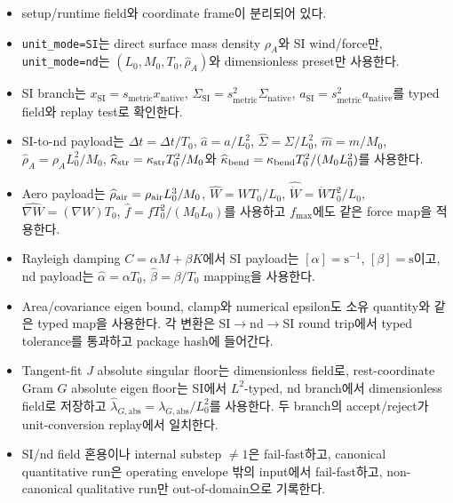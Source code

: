 \documentclass[10pt]{article}
\newcommand{\code}[1]{{\small\nolinkurl{#1}}}
\begin{document}
\begin{itemize}
  \item [\(\square\)] setup/runtime field와 coordinate frame이 분리되어 있다.
  \item [\(\square\)] \code{unit\_mode=SI}는 direct surface mass density \(\rho_A\)와 SI wind/force만,
  \code{unit\_mode=nd}는 \((L_0,M_0,T_0,\widehat\rho_A)\)와 dimensionless preset만 사용한다.
  \item [\(\square\)] SI branch는
  \(x_{\mathrm{SI}}=s_{\mathrm{metric}}x_{\mathrm{native}}\),
  \(\Sigma_{\mathrm{SI}}=s_{\mathrm{metric}}^2\Sigma_{\mathrm{native}}\),
  \(a_{\mathrm{SI}}=s_{\mathrm{metric}}^2a_{\mathrm{native}}\)를 typed field와 replay test로 확인한다.
  \item [\(\square\)] SI-to-nd payload는
  \(\widehat{\Delta t}=\Delta t/T_0\),
  \(\widehat a=a/L_0^2\), \(\widehat\Sigma=\Sigma/L_0^2\),
  \(\widehat m=m/M_0\), \(\widehat\rho_A=\rho_A L_0^2/M_0\),
  \(\widehat\kappa_{\rm str}=\kappa_{\rm str}T_0^2/M_0\)와
  \(\widehat\kappa_{\rm bend}=\kappa_{\rm bend}T_0^2/(M_0L_0^2)\)를 사용한다.
  \item [\(\square\)] Aero payload는
  \(\widehat\rho_{\rm air}=\rho_{\rm air}L_0^3/M_0\),
  \(\widehat W=WT_0/L_0\),
  \(\widehat{\dot W}=\dot W T_0^2/L_0\),
  \(\widehat{\nabla W}=(\nabla W)T_0\),
  \(\widehat f=fT_0^2/(M_0L_0)\)를 사용하고 \(f_{\max}\)에도 같은 force map을 적용한다.
  \item [\(\square\)] Rayleigh damping \(C=\alpha M+\beta K\)에서 SI payload는
  \([\alpha]=\mathrm{s}^{-1}\), \([\beta]=\mathrm{s}\)이고, nd payload는
  \(\widehat\alpha=\alpha T_0\), \(\widehat\beta=\beta/T_0\) mapping을 사용한다.
  \item [\(\square\)] Area/covariance eigen bound, clamp와 numerical epsilon도 소유 quantity와
  같은 typed map을 사용한다. 각 변환은 SI\(\rightarrow\)nd\(\rightarrow\)SI round trip에서
  typed tolerance를 통과하고 package hash에 들어간다.
  \item [\(\square\)] Tangent-fit \(J\) absolute singular floor는 dimensionless field로,
  rest-coordinate Gram \(G\) absolute eigen floor는 SI에서 \(L^2\)-typed,
  nd branch에서 dimensionless field로 저장하고
  \(\widehat\lambda_{G,\mathrm{abs}}=\lambda_{G,\mathrm{abs}}/L_0^2\)를 사용한다.
  두 branch의 accept/reject가 unit-conversion replay에서 일치한다.
  \item [\(\square\)] SI/nd field 혼용이나 internal substep \(\ne 1\)은 fail-fast하고,
  canonical quantitative run은 operating envelope 밖의 input에서 fail-fast하고,
  non-canonical qualitative run만 out-of-domain으로 기록한다.

\end{itemize}
\end{document}
